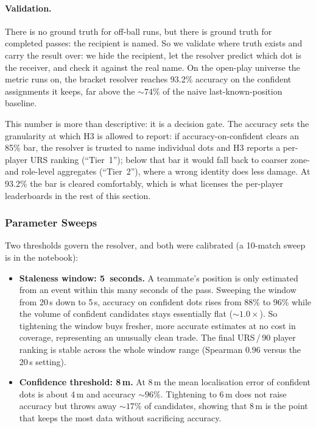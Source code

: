 \documentclass[12pt,a4paper]{article}
\begin{document}
\paragraph{Validation.}
There is no ground truth for off-ball runs, but there is ground truth for completed passes: the recipient is named.
So we validate where truth exists and carry the result over: we hide the recipient, let the resolver predict which dot is the receiver, and check it against the real name.
On the open-play universe the metric runs on, the bracket resolver reaches 93.2\% accuracy on the confident assignments it keeps, far above the ${\sim}74\%$ of the naive last-known-position baseline.

This number is more than descriptive: it is a decision gate. The accuracy sets the granularity at which H3 is allowed to report: if accuracy-on-confident clears an 85\% bar, the resolver is trusted to name individual dots and H3 reports a per-player URS ranking (``Tier~1''); below that bar it would fall back to coarser zone- and role-level aggregates (``Tier~2''), where a wrong identity does less damage. At 93.2\% the bar is cleared comfortably, which is what licenses the per-player leaderboards in the rest of this section.

\subsubsection{Parameter Sweeps}\label{sec:sweeps}

Two thresholds govern the resolver, and both were calibrated (a 10-match sweep is in the notebook):
\begin{itemize}
    \item \textbf{Staleness window: 5~seconds.} A teammate's position is only estimated from an event within this many seconds of the pass. Sweeping the window from 20\,s down to 5\,s, accuracy on confident dots rises from 88\% to 96\% while the volume of confident candidates stays essentially flat (${\sim}1.0\times$). So tightening the window buys fresher, more accurate estimates at no cost in coverage, representing an unusually clean trade. The final URS\,/\,90 player ranking is stable across the whole window range (Spearman $0.96$ versus the 20\,s setting).
    \item \textbf{Confidence threshold: 8\,m.} At 8\,m the mean localisation error of confident dots is about 4\,m and accuracy ${\sim}96\%$. Tightening to 6\,m does not raise accuracy but throws away ${\sim}17\%$ of candidates, showing that 8\,m is the point that keeps the most data without sacrificing accuracy.
\end{itemize}
\end{document}
